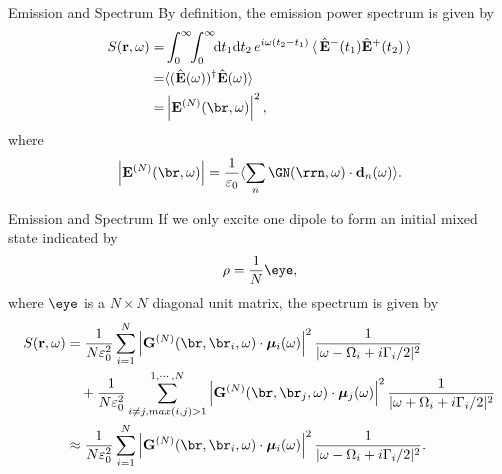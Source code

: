 \documentclass{beamer}
\begin{document}




\begin{frame}{Emission and Spectrum}
By definition, the emission power spectrum is given by
\begin{align}
 \label{spectrumdef}
S(\mathbf{r},\omega) =& \int_0^\infty \!\! \int_0^\infty\!\!
\mathrm{d}t_1\mathrm{d}t_2 \, e^{i\omega(t_2-t_1)}\mathinner{\langle}\hat{\mathbf{E}}^-(t_1)\hat{\mathbf{E}}^+(t_2)\mathinner{\rangle} \\
=& \langle
(\hat{\mathbf{E}}(\omega))^{\dagger}\hat{\mathbf{E}}(\omega)\rangle\\
=& \left|\mathbf{E}^{(N)}(\br,\omega)\right|^2,
\end{align}
where
\begin{equation}
 \left| \mathbf{E}^{(N)}(\br,\omega)\right| =\frac{1}{\varepsilon_0}\langle \sum_n{\GN(\rrn,\omega)\cdot \mathbf{d}_n(\omega)}\rangle.
\end{equation}
\end{frame}

\begin{frame}{Emission and Spectrum}
\fontsize{9}{-0.2}\selectfont
If we only excite one dipole to form an initial mixed state indicated by
\begin{equation}
\rho=\frac{1}{N}\eye,
\end{equation}
where $\eye$ is a $N\times N$ diagonal unit matrix, the spectrum is given by 
\begin{align}
S({\bf r},\omega)&=\frac{1}{N\varepsilon_0^2}\sum_{i=1}^N{\left| \mathbf{G}^{(N)}(\br,\br_i,\omega)\cdot {\bm \mu}_i(\omega) \right|^2 \frac{1}{|\omega-\Omega_i+i\Gamma_i/2|^2}} \nonumber \\
&\quad +\frac{1}{N\varepsilon_0^2}\sum_{i\neq j,max(i,j)>1}^{1,\cdots,N}{\left| \mathbf{G}^{(N)}(\br,\br_j,\omega)\cdot {\bm \mu}_j(\omega) \right|^2 \frac{1}{|\omega+\Omega_i+i\Gamma_i/2|^2}}\nonumber \\
&\approx \frac{1}{N\varepsilon_0^2}\sum_{i=1}^N{\left| \mathbf{G}^{(N)}(\br,\br_i,\omega)\cdot {\bm \mu}_i(\omega) \right|^2 \frac{1}{|\omega-\Omega_i+i\Gamma_i/2|^2}}.\nonumber
\end{align}



\end{frame}
\end{document}
